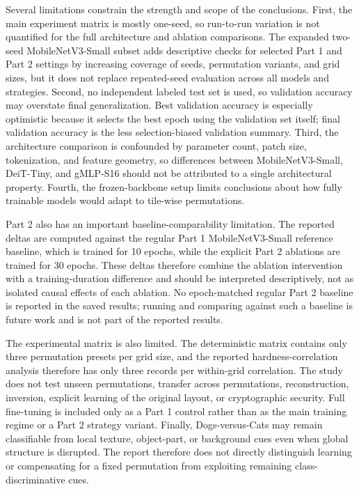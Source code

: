 \documentclass[12pt]{article}
\begin{document}
Several limitations constrain the strength and scope of the conclusions. First, the main experiment matrix is mostly one-seed, so run-to-run variation is not quantified for the full architecture and ablation comparisons. The expanded two-seed MobileNetV3-Small subset adds descriptive checks for selected Part 1 and Part 2 settings by increasing coverage of seeds, permutation variants, and grid sizes, but it does not replace repeated-seed evaluation across all models and strategies. Second, no independent labeled test set is used, so validation accuracy may overstate final generalization. Best validation accuracy is especially optimistic because it selects the best epoch using the validation set itself; final validation accuracy is the less selection-biased validation summary. Third, the architecture comparison is confounded by parameter count, patch size, tokenization, and feature geometry, so differences between MobileNetV3-Small, DeiT-Tiny, and gMLP-S16 should not be attributed to a single architectural property. Fourth, the frozen-backbone setup limits conclusions about how fully trainable models would adapt to tile-wise permutations.

Part 2 also has an important baseline-comparability limitation. The reported deltas are computed against the regular Part 1 MobileNetV3-Small reference baseline, which is trained for 10 epochs, while the explicit Part 2 ablations are trained for 30 epochs. These deltas therefore combine the ablation intervention with a training-duration difference and should be interpreted descriptively, not as isolated causal effects of each ablation. No epoch-matched regular Part 2 baseline is reported in the saved results; running and comparing against such a baseline is future work and is not part of the reported results.

The experimental matrix is also limited. The deterministic matrix contains only three permutation presets per grid size, and the reported hardness-correlation analysis therefore has only three records per within-grid correlation. The study does not test unseen permutations, transfer across permutations, reconstruction, inversion, explicit learning of the original layout, or cryptographic security. Full fine-tuning is included only as a Part 1 control rather than as the main training regime or a Part 2 strategy variant. Finally, Dogs-versus-Cats may remain classifiable from local texture, object-part, or background cues even when global structure is disrupted. The report therefore does not directly distinguish learning or compensating for a fixed permutation from exploiting remaining class-discriminative cues.
\end{document}
